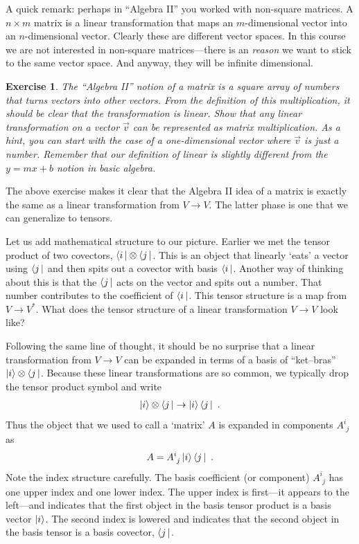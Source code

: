 \documentclass[
  11pt,
	colorful,
	raggedright,
]{tufte-style-thesis-flip}
\newtheorem{exercise}{Exercise}[section]
\newcommand{\aij}[2]{^{#1}_{\phantom{#1}#2}}
\begin{document}
A quick remark: perhaps in ``Algebra II'' you worked with non-square matrices. A $n\times m$ matrix is a linear transformation that maps an $m$-dimensional vector into an $n$-dimensional vector. Clearly these are different vector spaces. In this course we are not interested in non-square matrices---there is an \emph{reason} we want to stick to the same vector space. And anyway, they will be infinite dimensional.
\begin{exercise}\label{ex:linear:transformation:are:matrices}
The ``Algebra II'' notion of a matrix is a square array of numbers that turns vectors into other vectors. From the definition of this multiplication, it should be clear that the transformation is linear. Show that \emph{any} linear transformation on a vector $\vec{v}$ can be represented as matrix multiplication. As a hint, you can start with the case of a one-dimensional vector where $\vec{v}$ is just a number. Remember that our definition of linear is slightly different from the $y=mx+b$ notion in basic algebra.
\end{exercise}
The above exercise makes it clear that the Algebra II idea of a matrix is exactly the same as a linear transformation from $V\to V$. The latter phase is one that we can generalize to tensors.

Let us add mathematical structure to our picture. Earlier we met the tensor product of two covectors, $\left\langle i\,\right|\otimes\left\langle j\,\right|$. This is an object that linearly `eats' a vector using $\left\langle j\,\right|$ and then spits out a covector with basis $\left\langle i\,\right|$. Another way of thinking about this is that the $\left\langle j\,\right|$ acts on the vector and spits out a number. That number contributes to the coefficient of $\left\langle i\,\right|$. This tensor structure is a map from $V\to V^*$. What does the tensor structure of a linear transformation $V\to V$ look like?

Following the same line of thought, it should be no surprise that a linear transformation from $V\to V$ can be expanded in terms of a basis of ``ket--bras'' $\left|i\right\rangle\otimes\left\langle j\,\right|$. Because these linear transformations are so common, we typically drop the tensor product symbol and write
\begin{align}
  \left|i\right\rangle\otimes\left\langle j\,\right| \to \left|i\right\rangle\left\langle j\,\right| \ .
\end{align}
Thus the object that we used to call a `matrix' $A$ is expanded in components $A\aij{i}{j}$ as
\begin{align}
  A = A\aij{i}{j}\ket{i}\bra{j} \ .
\end{align}
Note the index structure carefully. The basis coefficient (or component) $A\aij{i}{j}$ has one upper index and one lower index. The upper index is first---it appears to the left---and indicates that the first object in the basis tensor product is a basis vector $\left|i\right\rangle$. The second index is lowered and indicates that the second object in the basis tensor is a basis covector, $\left\langle j\,\right|$. 
\end{document}
